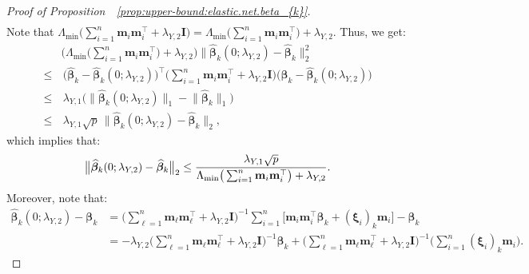 \documentclass[
  12pt]{article}
\def\M{\mathbf{m}}
\begin{document}
\begin{proof}[Proof of Proposition~~\ref{prop:upper-bound:elastic.net.beta_{k}}]
\begin{align*}
	\end{align*}  
	Note that  $\Lambda_{\min} \big(  \sum_{i=1}^{n} \M_{i} \M_{i}^{\top}  + \lambda_{Y,2} \mathbf{I} \big) = \Lambda_{\min} \big(  \sum_{i=1}^{n} \M_{i} \M_{i}^{\top} \big)  + \lambda_{Y,2}$. 
	Thus, we get:  
	\begin{align*}
		&\Big( \Lambda_{\min} \big( \sum_{i=1}^{n} \M_{i} \M_{i}^{\top} \big)  + \lambda_{Y,2} \Big)  \big\|   \widehat{\bm{\beta}}_{k} (0;\lambda_{Y,2})      -   \widehat{\bm{\beta}}_{k}     \big\|_{2}^{2}   
		\\
		\leq  & \,   \Big( \widehat{\bm{\beta}}_{k}  - \widehat{\bm{\beta}}_{k} (0 ; \lambda_{Y,2})  \Big)^{\top}  
		\Big( \sum_{i=1}^{n} \M_{i} \M_{i}^{\top}   
		+ \lambda_{Y,2} \mathbf{I}  \Big) 
		\Big( \widehat{\bm{\beta}}_{k}  - \widehat{\bm{\beta}}_{k} (0 ; \lambda_{Y,2})  \Big) 
		\\
		\leq  &  \,  \lambda_{Y,1}  \Big(   \big\|   \widehat{\bm{\beta}}_{k} (0;\lambda_{Y,2})    \big\|_{1}  -  \big\|   \widehat{\bm{\beta}}_{k}    \big\|_{1}   \Big)    
		\\
		\leq  &  \,  \lambda_{Y,1} \sqrt{p} \,  \big\|   \widehat{\bm{\beta}}_{k} (0;\lambda_{Y,2})      -   \widehat{\bm{\beta}}_{k}    \big\|_{2},   
	\end{align*} 
	which implies that:
    \begin{align}
		\big\|   \widehat{\bm{\beta}}_{k} (0;\lambda_{Y,2})      -   \widehat{\bm{\beta}}_{k}    \big\|_{2}  
		\leq   \dfrac{ \lambda_{Y,1} \sqrt{p} }{  \Lambda_{\min} \big(  \sum_{i=1}^{n} \M_{i} \M_{i}^{\top} \big)  + \lambda_{Y,2} } .  
		\label{proof:prop:upper-bound:elastic.net.beta_{k}:bound1}
	\end{align}    
	Moreover, note that: 
	\begin{align*}
		\widehat{\bm{\beta}}_{k} ( 0 ; \lambda_{Y,2} ) - \bm{\beta}_{k}    &=    
		\Big( \sum_{\ell = 1}^{n} \M_{\ell}   \M_{\ell}^{\top}  + \lambda_{Y,2} \mathbf{I}      \Big)^{-1}   \sum_{i=1}^{n} \Big[  \M_{i} \M_{i}^{\top}  \bm{\beta}_{k}  +  ( \bm{\xi}_{i} )_{k} \M_{i}   \Big]  -  \bm{\beta}_{k}  
		\\
		&=   - \lambda_{Y,2}  \Big( \sum_{\ell = 1}^{n} \M_{\ell}   \M_{\ell}^{\top}  + \lambda_{Y,2} \mathbf{I}      \Big)^{-1}  \bm{\beta}_{k}  +  \Big(  \sum_{\ell = 1}^{n} \M_{\ell}   \M_{\ell}^{\top}  + \lambda_{Y,2} \mathbf{I}      \Big)^{-1} \Big(  \sum_{i=1}^{n}  (\bm{\xi}_{i})_{k}  \M_{i} \Big).
	\end{align*}  

\end{proof}
\end{document}
